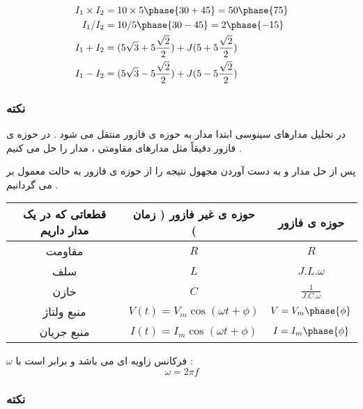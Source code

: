 \documentclass[12pt]{book}
\begin{document}
\begin{align*}
I_{1} \times I_{2} &= 10 \times 5 \phase{30 + 45} = 50 \phase{75} \\
I_{1} / I_{2} &= 10 / 5 \phase{30 - 45} = 2 \phase{-15} \\
I_{1} + I_{2} &= ( 5 \sqrt{3} + 5 \frac{\sqrt{2}}{2} ) + J ( 5 + 5 \frac{\sqrt{2}}{2} ) \\
I_{1} - I_{2} &= ( 5 \sqrt{3} - 5 \frac{\sqrt{2}}{2} ) + J (  5 - 5 \frac{\sqrt{2}}{2} ) \\
\end{align*}




\subsubsection{نکته}

در تحلیل مدارهای سینوسی ابتدا مدار به حوزه ی فازور منتقل می شود . در حوزه ی فازور دقیقاً مثل مدارهای مقاومتی ، مدار را حل می کنیم .

پس از حل مدار و به دست آوردن مجهول نتیجه را از حوزه ی فازور به حالت  معمول بر می گردانیم .


\begin{center}
  \bgroup
  \def\arraystretch{1.5}%
  \begin{tabular}{ c | c | c  }
    قطعاتی که در یک مدار داریم
     & حوزه ی غیر فازور ( زمان )
      & حوزه ی فازور
       \\ \hline
    مقاومت
     & $R$ & $R$ \\ \hline
    سلف
     & $L$ & $J.L.\omega$  \\ \hline
    خازن
     & $C$ & $\frac{1}{J.C.\omega}$  \\ \hline
    منبع ولتاژ
     & $V(t) = V_{m}\cos{(\omega t + \phi)}$ & 
     $V = V_{m} \phase{\phi}$  \\ \hline
    منبع جریان
     & $I(t) = I_{m} \cos{(\omega t + \phi)}$ & 
     $I = I_{m} \phase{\phi}$  \\ 
  \end{tabular}
  \egroup
\end{center}


\begin{tcolorbox}
$\omega$
فرکانس زاویه ای می باشد و برابر است با :
$$
\omega = 2 \pi f
$$
\end{tcolorbox}




\subsubsection{نکته}
\end{document}
